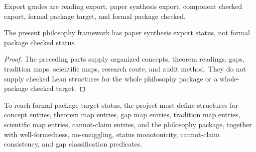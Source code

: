\begin{definition}
\label{def:philosophy-export-grade}
Export grades are reading export, paper synthesis export, component
checked export, formal package target, and formal package checked.
\end{definition}

\begin{theorem}
\label{thm:philosophy-current-export-grade}
The present philosophy framework has paper synthesis export status, not
formal package checked status.
\end{theorem}
\begin{proof}
The preceding parts supply organized concepts, theorem readings, gaps,
tradition maps, scientific maps, research route, and audit method.
They do not supply checked Lean structures for the whole philosophy
package or a whole-package checked target.
\end{proof}

\begin{corollary}
\label{cor:philosophy-export-upgrade-path}
To reach formal package target status, the project must define
structures for concept entries, theorem map entries, gap map entries,
tradition map entries, scientific map entries, cannot-claim entries,
and the philosophy package, together with well-formedness,
no-smuggling, status monotonicity, cannot-claim consistency, and gap
classification predicates.
\end{corollary}

